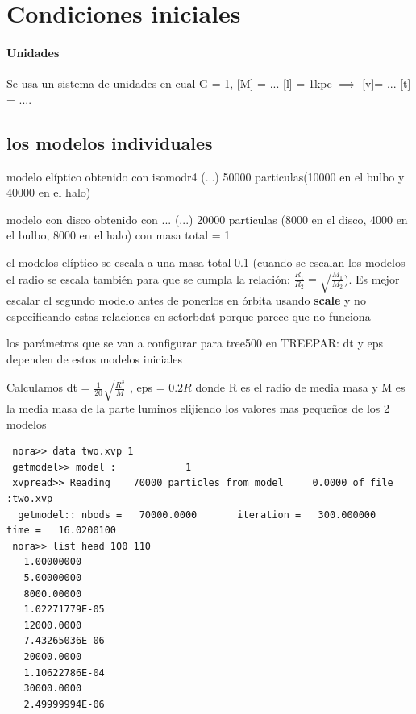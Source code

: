 \documentclass[12pt]{article} %
\renewcommand{\=}[1]{\stackrel{#1}{=}} %
\theoremstyle{definition}
\theoremstyle{remark}
\begin{document}
\section*{Condiciones iniciales}

\paragraph{Unidades}
Se usa un sistema de unidades en cual G = 1, [M] = ...  [l] = 1kpc $\implies$ [v]= ... [t] = ....


\subsection*{los modelos individuales}

\begin{description}
\item modelo elíptico obtenido con isomodr4 (...) 50000 particulas(10000 en el bulbo y 40000 en el halo)
\item modelo con disco obtenido con ... (...) 20000 particulas (8000 en el disco, 4000 en el bulbo, 8000 en el halo) con masa total = 1
\item el modelos elíptico se escala a una masa total 0.1 (cuando se escalan los modelos el radio se escala también para que se cumpla la relación: $\frac{R_1}{R_2} = \sqrt{\frac{M_1}{M_2}}$). Es mejor escalar el segundo modelo antes de ponerlos en órbita usando \textbf{scale} y no especificando estas relaciones en setorbdat porque parece que no funciona
\item los parámetros que se van a configurar para tree500 en TREEPAR: dt y eps dependen de estos modelos iniciales
\begin{description}
\item Calculamos dt = $\frac{1}{20}\sqrt{\frac{R^3}{M}}$ ,  eps = $0.2 R$ donde R es el radio de media masa y M es la media masa de la parte luminos elijiendo los valores mas pequeños de los 2 modelos
\item
\small
\begin{verbatim}
 nora>> data two.xvp 1
 getmodel>> model :            1
 xvpread>> Reading    70000 particles from model     0.0000 of file :two.xvp                                 
  getmodel:: nbods =   70000.0000       iteration =   300.000000       time =   16.0200100    
 nora>> list head 100 110
   1.00000000    
   5.00000000    
   8000.00000    
   1.02271779E-05
   12000.0000    
   7.43265036E-06
   20000.0000    
   1.10622786E-04
   30000.0000    
   2.49999994E-06

\end{verbatim}
\end{description}
\end{description}
\end{document}
